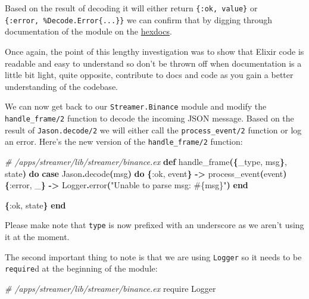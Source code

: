 \documentclass[
  oneside]{book}
\newenvironment{Shaded}{\begin{snugshade}}{\end{snugshade}}
\newcommand{\CommentTok}[1]{\textcolor[rgb]{0.56,0.35,0.01}{\textit{#1}}}
\newcommand{\ConstantTok}[1]{\textcolor[rgb]{0.56,0.35,0.01}{#1}}
\newcommand{\FunctionTok}[1]{\textcolor[rgb]{0.13,0.29,0.53}{\textbf{#1}}}
\newcommand{\ImportTok}[1]{#1}
\newcommand{\KeywordTok}[1]{\textcolor[rgb]{0.13,0.29,0.53}{\textbf{#1}}}
\newcommand{\NormalTok}[1]{#1}
\newcommand{\OperatorTok}[1]{\textcolor[rgb]{0.81,0.36,0.00}{\textbf{#1}}}
\newcommand{\OtherTok}[1]{\textcolor[rgb]{0.56,0.35,0.01}{#1}}
\newcommand{\StringTok}[1]{\textcolor[rgb]{0.31,0.60,0.02}{#1}}
\newcommand{\VariableTok}[1]{\textcolor[rgb]{0.00,0.00,0.00}{#1}}
\begin{document}
Based on the result of decoding it will either return \texttt{\{:ok,\ value\}} or \texttt{\{:error,\ \%Decode.Error\{...\}\}} we can confirm that by digging through documentation of the module on the \href{https://hexdocs.pm/jason/Jason.html\#decode/2}{hexdocs}.

Once again, the point of this lengthy investigation was to show that Elixir code is readable and easy to understand so don't be thrown off when documentation is a little bit light, quite opposite, contribute to docs and code as you gain a better understanding of the codebase.

We can now get back to our \texttt{Streamer.Binance} module and modify the \texttt{handle\_frame/2} function to decode the incoming JSON message. Based on the result of \texttt{Jason.decode/2} we will either call the \texttt{process\_event/2} function or log an error. Here's the new version of the \texttt{handle\_frame/2} function:

\begin{Shaded}
\begin{Highlighting}[]
  \CommentTok{\# /apps/streamer/lib/streamer/binance.ex}
  \KeywordTok{def}\NormalTok{ handle\_frame}\FunctionTok{(\{}\NormalTok{\_type, msg}\FunctionTok{\}}\NormalTok{, state}\FunctionTok{)} \KeywordTok{do}
    \KeywordTok{case} \ConstantTok{Jason}\OperatorTok{.}\NormalTok{decode}\FunctionTok{(}\NormalTok{msg}\FunctionTok{)} \KeywordTok{do}
      \FunctionTok{\{}\VariableTok{:ok}\NormalTok{, event}\FunctionTok{\}} \OperatorTok{{-}\textgreater{}}\NormalTok{ process\_event}\FunctionTok{(}\NormalTok{event}\FunctionTok{)}
      \FunctionTok{\{}\VariableTok{:error}\NormalTok{, \_}\FunctionTok{\}} \OperatorTok{{-}\textgreater{}} \ConstantTok{Logger}\OperatorTok{.}\NormalTok{error}\FunctionTok{(}\StringTok{"Unable to parse msg: }\OtherTok{\#\{}\NormalTok{msg}\OtherTok{\}}\StringTok{"}\FunctionTok{)}
    \KeywordTok{end}

    \FunctionTok{\{}\VariableTok{:ok}\NormalTok{, state}\FunctionTok{\}}
  \KeywordTok{end}
\end{Highlighting}
\end{Shaded}

Please make note that \texttt{type} is now prefixed with an underscore as we aren't using it at the moment.

The second important thing to note is that we are using \texttt{Logger} so it needs to be \texttt{require}d at the beginning of the module:

\begin{Shaded}
\begin{Highlighting}[]
  \CommentTok{\# /apps/streamer/lib/streamer/binance.ex}
  \ImportTok{require} \ConstantTok{Logger}
\end{Highlighting}
\end{Shaded}
\end{document}
